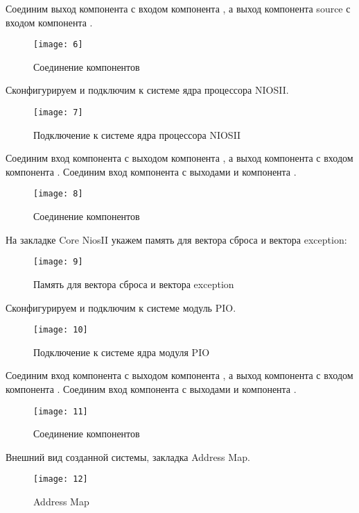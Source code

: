 Соединим выход  компонента  с входом  компонента , а выход  компонента  source с входом  компонента .
\begin{figure}[H]
	\centering
	\texttt{[image: 6]}
	\caption{Соединение компонентов}
\end{figure}

Сконфигурируем и подключим к системе ядра процессора NIOSII.
\begin{figure}[H]
	\centering
	\texttt{[image: 7]}
	\caption{Подключение к системе ядра процессора NIOSII}
\end{figure}

Соединим вход  компонента  с выходом  компонента , а выход  компонента  с входом  компонента . Соединим вход  компонента  с выходами  и  компонента .
\begin{figure}[H]
	\centering
	\texttt{[image: 8]}
	\caption{Соединение компонентов}
\end{figure}

На закладке Core NiosII укажем память для вектора сброса и вектора exception:
\begin{figure}[H]
	\centering
	\texttt{[image: 9]}
	\caption{Память для вектора сброса и вектора exception}
\end{figure}

Сконфигурируем и подключим к системе модуль PIO.
\begin{figure}[H]
	\centering
	\texttt{[image: 10]}
	\caption{Подключение к системе ядра модуля PIO}
\end{figure}

Соединим вход  компонента  с выходом  компонента , а выход  компонента  с входом  компонента . Соединим вход  компонента  с выходами  и  компонента .
\begin{figure}[H]
	\centering
	\texttt{[image: 11]}
	\caption{Соединение компонентов}
\end{figure}

Внешний вид созданной системы, закладка Address Map.
\begin{figure}[H]
	\centering
	\texttt{[image: 12]}
	\caption{Address Map}
\end{figure}

